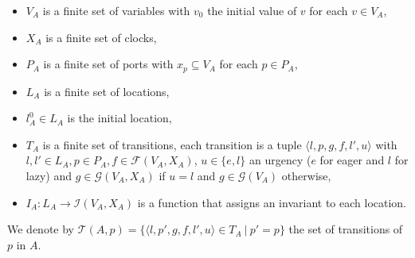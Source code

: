 \documentclass[a4paper]{article}
\begin{document}
\begin{itemize}
  \item $V_A$ is a finite set of variables with $v_0$ the initial value of $v$ for each $v \in V_A$,
  \item $X_A$ is a finite set of clocks,
  \item $P_A$ is a finite set of ports with $x_p \subseteq V_A$ for each $p \in P_A$,
  \item $L_A$ is a finite set of locations,
  \item $l_A^0 \in L_A$ is the initial location,
  \item $T_A$ is a finite set of transitions, each transition is a tuple $\langle l, p, g, f, l', u \rangle$ with
        $l,l' \in L_A, p \in P_A, f \in \mathcal{F}(V_A, X_A)$, $u \in \{e,l\}$ an urgency ($e$ for eager and $l$ for
        lazy) and $g \in \mathcal{G}(V_A, X_A)$ if $u = l$ and $g \in \mathcal{G}(V_A)$ otherwise,
  \item $I_A: L_A \to \mathcal{I}(V_A,X_A)$ is a function that assigns an invariant to each location.
\end{itemize}
We denote by $\mathcal{T}(A,p)=\{\langle l, p', g, f, l',u \rangle \in T_{A} \:\vert\: p'=p\}$ the set of transitions
of $p$ in $A$.
\end{document}
